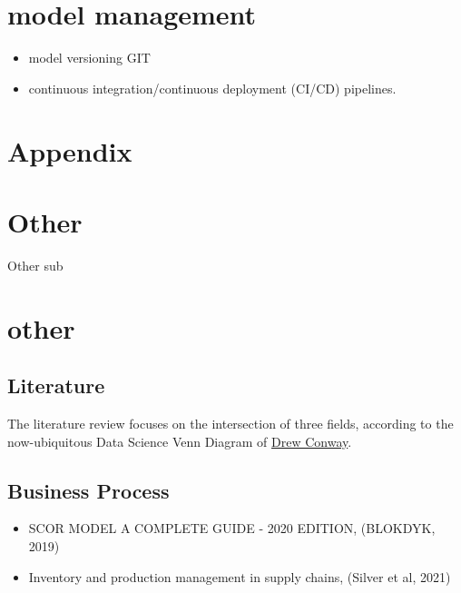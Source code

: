 \documentclass[
  american,
  10,
  a4paper,
]{book}
\providecommand{\tightlist}{%
  \setlength{\itemsep}{0pt}\setlength{\parskip}{0pt}}
\theoremstyle{definition}
\theoremstyle{remark}
\begin{document}
\chapter{model management}\label{model-management}

\begin{itemize}
\tightlist
\item
  model versioning GIT
\item
  continuous integration/continuous deployment (CI/CD) pipelines.
\end{itemize}

\chapter*{Appendix}\label{appendix-3}


\chapter{Other}\label{other}

Other sub

\hfill\break

\chapter*{other}\label{other-1}


\section{Literature}\label{sec-literature_review}

The literature review focuses on the intersection of three fields,
according to the now-ubiquitous Data Science Venn Diagram of
\href{http://drewconway.com/zia/2013/3/26/the-data-science-venn-diagram}{Drew
Conway}.

\section{Business Process}\label{business-process}

\begin{itemize}
\tightlist
\item
  SCOR MODEL A COMPLETE GUIDE - 2020 EDITION, (BLOKDYK, 2019)
\item
  Inventory and production management in supply chains, (Silver et al,
  2021)
\end{itemize}
\end{document}
